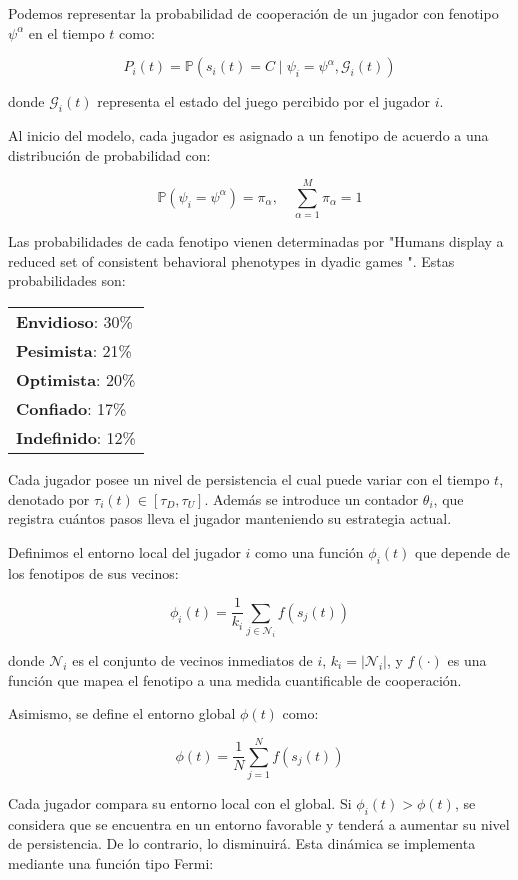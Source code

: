 \documentclass[a4paper,12pt]{report}
\begin{document}
Podemos representar la probabilidad de cooperación de un jugador con fenotipo \( \psi^\alpha \) en el tiempo \( t \) como:

\[
P_i(t) = \mathbb{P}(s_i(t) = C \mid \psi_i = \psi^\alpha, \mathcal{G}_i(t))
\]

donde \( \mathcal{G}_i(t) \) representa el estado del juego percibido por el jugador \( i \).

Al inicio del modelo, cada jugador es asignado a un fenotipo de acuerdo a una distribución de probabilidad con:

\[
\mathbb{P}(\psi_i = \psi^\alpha) = \pi_\alpha, \quad \sum_{\alpha=1}^{M} \pi_\alpha = 1
\]

Las probabilidades de cada fenotipo vienen determinadas por "Humans display a reduced set of consistent behavioral phenotypes in dyadic games "\cite{paper_principal}. Estas probabilidades son:

\begin{center}
\small
\begin{tabular}{l}
\textbf{Envidioso}: 30\% \\
\textbf{Pesimista}: 21\% \\
\textbf{Optimista}: 20\% \\
\textbf{Confiado}: 17\% \\
\textbf{Indefinido}: 12\% \\
\end{tabular}
\end{center}

Cada jugador posee un nivel de persistencia el cual puede variar con el tiempo \(t\), denotado por \( \tau_i(t) \in [\tau_D, \tau_U] \). Además se introduce un contador \( \theta_i \), que registra cuántos pasos lleva el jugador manteniendo su estrategia actual.

Definimos el entorno local del jugador \( i \) como una función \( \phi_i(t) \) que depende de los fenotipos de sus vecinos:

\[
\phi_i(t) = \frac{1}{k_i} \sum_{j \in \mathcal{N}_i} f(s_j(t))
\]

donde \( \mathcal{N}_i \) es el conjunto de vecinos inmediatos de \( i \), \( k_i = |\mathcal{N}_i| \), y \( f(\cdot) \) es una función que mapea el fenotipo a una medida cuantificable de cooperación.

Asimismo, se define el entorno global \( \phi(t) \) como:

\[
\phi(t) = \frac{1}{N} \sum_{j=1}^{N} f(s_j(t))
\]

Cada jugador compara su entorno local con el global. Si \( \phi_i(t) > \phi(t) \), se considera que se encuentra en un entorno favorable y tenderá a aumentar su nivel de persistencia. De lo contrario, lo disminuirá. Esta dinámica se implementa mediante una función tipo Fermi:
\end{document}
